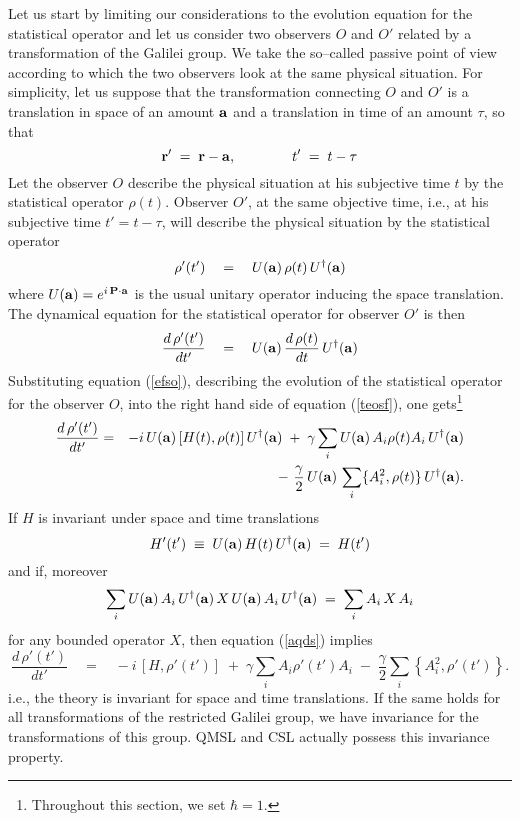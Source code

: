 \documentclass[12pt]{article}
\begin{document}
Let us start by limiting our considerations to the evolution
equation for the statistical operator and let us consider two
observers $O$ and $O'$ related by a transformation of the Galilei
group. We take the so--called passive point of view according to
which the two observers look at the same physical situation. For
simplicity, let us suppose that the transformation connecting $O$
and $O'$ is a translation in space of an amount ${\bf a}$ and a
translation in time of an amount $\tau$, so that
\begin{equation} \label{qdelg}
{\bf r}' \; = \; {\bf r} - {\bf a}, \qquad\qquad t'\; = \; t -
\tau
\end{equation}
Let the observer $O$ describe the physical situation at his
subjective time $t$ by the statistical operator $\rho(t)$.
Observer $O'$, at the same objective time, i.e., at his subjective
time $t' = t - \tau$, will describe the physical situation by the
statistical operator
\begin{equation}
\rho'(t')\quad = \quad U({\bf a})\, \rho(t)\, U^{\dagger}({\bf a})
\end{equation}
where $U({\bf a}) = e^{i\,{\bf P}\cdot {\bf a}}$ is the usual
unitary operator inducing the space translation. The dynamical
equation for the statistical operator for observer $O'$ is then
\begin{equation} \label{teosf}
\frac{d\, \rho'(t')}{dt'} \quad = \quad U({\bf a})\, \frac{d\,
\rho(t)}{dt}\, U^{\dagger}({\bf a})
\end{equation}
Substituting equation (\ref{efso}), describing the evolution of
the statistical operator for the observer $O$, into the right hand
side of equation (\ref{teosf}), one gets\footnote{Throughout this
section, we set $\hbar = 1$.}
\begin{eqnarray} \label{aqds}
\frac{d\, \rho'(t')}{dt'} & = & - i\, U({\bf a})\, [H(t),
\rho(t)]\, U^{\dagger}({\bf a}) \; + \; \gamma \sum_{i} U({\bf
a})\, A_{i} \rho(t) A_{i}\, U^{\dagger}({\bf a}) \nonumber
\\
& & -\ \frac{\gamma}{2}\, U({\bf a})\, \sum_{i} \{ A_{i}^{2},
\rho(t)\} \, U^{\dagger}({\bf a}).
\end{eqnarray}
If $H$ is invariant under space and time translations
\begin{equation}
H'(t') \; \equiv \; U({\bf a})\, H(t)\, U^{\dagger}({\bf a})\; =
\; H(t')
\end{equation}
and if, moreover
\begin{equation}
\sum_{i} U({\bf a})\, A_{i}\, U^{\dagger}({\bf a})\, X\, U({\bf
a})\, A_{i}\, U^{\dagger}({\bf a}) \; = \; \sum_{i} A_{i}\, X\,
A_{i}
\end{equation}
for any bounded operator $X$, then equation (\ref{aqds}) implies
\begin{equation} \label{gtlr}
\frac{d\, \rho'(t')}{dt'} \quad = \quad -i\, [H, \rho'(t')] \; +
\; \gamma \sum_{i} A_{i} \rho'(t') A_{i} \; - \; \frac{\gamma}{2}
\sum_{i} \left\{ A_{i}^{2}, \rho'(t') \right\}.
\end{equation}
i.e., the theory is invariant for space and time translations. If
the same holds for all transformations of the restricted Galilei
group, we have invariance for the transformations of this group.
QMSL and CSL actually possess this invariance property.
\end{document}
